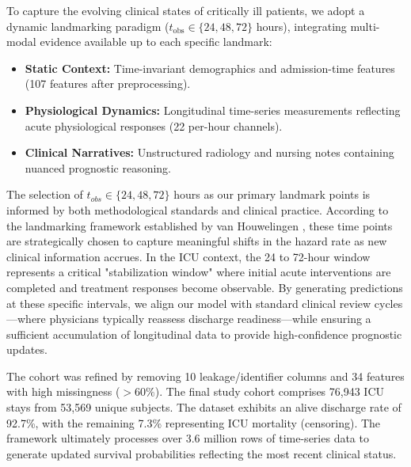 \documentclass[10pt, a4paper]{article}
\begin{document}
To capture the evolving clinical states of critically ill patients, we adopt a dynamic landmarking paradigm ($t_{\text{obs}} \in \{24, 48, 72\}$ hours), integrating multi-modal evidence available up to each specific landmark:

\begin{itemize}
    \item \textbf{Static Context:} Time-invariant demographics and admission-time features (107 features after preprocessing).
    \item \textbf{Physiological Dynamics:} Longitudinal time-series measurements reflecting acute physiological responses (22 per-hour channels).
    \item \textbf{Clinical Narratives:} Unstructured radiology and nursing notes containing nuanced prognostic reasoning.
\end{itemize}

The selection of $t_{obs} \in \{24, 48, 72\}$ hours as our primary landmark points is informed by both methodological standards and clinical practice. According to the landmarking framework established by van Houwelingen \cite{vanhouwelingen2007dynamic}, these time points are strategically chosen to capture meaningful shifts in the hazard rate as new clinical information accrues. In the ICU context, the 24 to 72-hour window represents a critical "stabilization window" where initial acute interventions are completed and treatment responses become observable. By generating predictions at these specific intervals, we align our model with standard clinical review cycles—where physicians typically reassess discharge readiness—while ensuring a sufficient accumulation of longitudinal data to provide high-confidence prognostic updates.


The cohort was refined by removing 10 leakage/identifier columns and 34 features with high missingness ($>60\%$). The final study cohort comprises 76,943 ICU stays from 53,569 unique subjects. The dataset exhibits an alive discharge rate of 92.7\%, with the remaining 7.3\% representing ICU mortality (censoring). The framework ultimately processes over 3.6 million rows of time-series data to generate updated survival probabilities reflecting the most recent clinical status.
\end{document}
